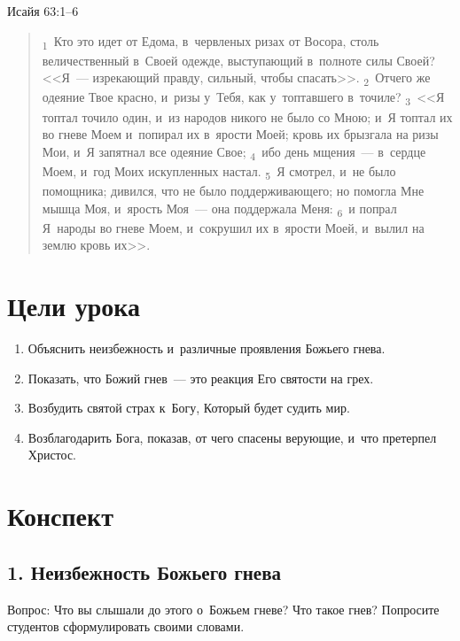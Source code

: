 \documentclass[a4paper,12pt]{article}
\begin{document}
Исайя 63:1--6

\begin{quote}
\textsubscript{1}~Кто это идет от Едома, в~червленых ризах от Восора, столь величественный в~Своей одежде, выступающий в~полноте силы Своей? <<Я~--- изрекающий правду, сильный, чтобы спасать>>. 
\textsubscript{2}~Отчего же одеяние Твое красно, и~ризы у~Тебя, как у~топтавшего в~точиле? 
\textsubscript{3}~<<Я топтал точило один, и~из народов никого не было со Мною; и~Я топтал их во гневе Моем и~попирал их в~ярости Моей; кровь их брызгала на ризы Мои, и~Я запятнал все одеяние Свое; 
\textsubscript{4}~ибо день мщения~--- в~сердце Моем, и~год Моих искупленных настал. 
\textsubscript{5}~Я смотрел, и~не было помощника; дивился, что не было поддерживающего; но помогла Мне мышца Моя, и~ярость Моя~--- она поддержала Меня: 
\textsubscript{6}~и попрал Я~народы во гневе Моем, и~сокрушил их в~ярости Моей, и~вылил на землю кровь их>>. 
\end{quote}

\section{Цели урока}
\begin{enumerate}
    \item Объяснить неизбежность и~различные проявления Божьего гнева.
    \item Показать, что Божий гнев~--- это реакция Его святости на грех.
    \item Возбудить святой страх к~Богу, Который будет судить мир.
    \item Возблагодарить Бога, показав, от чего спасены верующие, и~что претерпел Христос.
\end{enumerate}

\section{Конспект}

\subsection{1. Неизбежность Божьего гнева}

Вопрос: Что вы слышали до этого о~Божьем гневе? Что такое гнев? Попросите студентов сформулировать своими словами.
\end{document}

